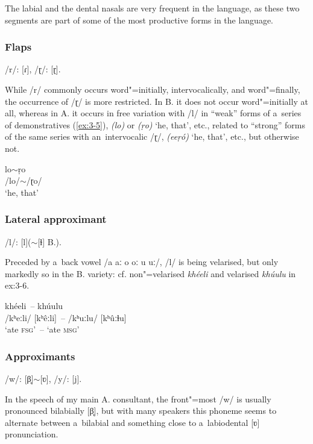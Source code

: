 The labial and the dental nasals are very frequent in the language, as these two segments are part of some of the most productive  forms in the language.

\subsubsection*{Flaps}

/r/: [ɾ], /ɽ/: [ɽ].


While /r/ commonly occurs word"=initially, intervocalically, and word"=finally, the occurrence of /ɽ/
is more restricted. In B. it does not occur word"=initially at all, whereas in A. it occurs in free
variation with /l/ in ``weak'' forms of a~series of demonstratives (\ref{ex:3-5}), \textit{(lo)} or
\textit{(ṛo)} `he, that', etc., related to ``strong'' forms of the same series with an~intervocalic
/ɽ/, \textit{(eeṛó)} `he, that', etc., but otherwise not.

\begin{exe}
\ex
\label{ex:3-5}
\gll lo$\sim${}ṛo \\
/lo/$\sim${}/ɽo/ \\
\glt `he, that' 
\end{exe}

\subsubsection*{Lateral approximant}

/l/: [l]($\sim$[ɫ] B.).


Preceded by a~back vowel /a aː o oː u uː/, /l/ is being velarised, but only markedly so in the B. variety: cf. non"=velarised \textit{khéeli} and velarised \textit{khúulu} in {ex:3-6}.

\begin{exe}
\ex
\label{ex:3-6}
\gll khéeli~-- khúulu \\
/kʰeːli/ [kʰêːli]~-- /kʰuːlu/ [kʰûːɫu] \\ 
\glt `ate \textsc{fsg}'~-- `ate \textsc{msg}'
\end{exe}

\subsubsection*{Approximants}

/w/: [β̞]$\sim$[ʋ], /y/: [j].


In the speech of my main A. consultant, the front"=most  /w/ is usually pronounced bilabially [β̞], but with many speakers this phoneme seems to alternate between a~bilabial and something close to a~labiodental [ʋ] pronunciation.


